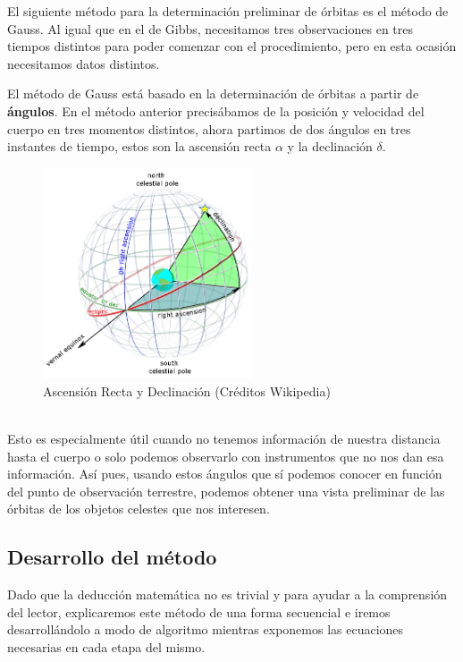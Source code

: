 \documentclass{article}
\numberwithin{equation}{section}
\begin{document}
El siguiente método para la determinación preliminar de órbitas es el método de Gauss. Al igual que en el de Gibbs, necesitamos tres observaciones en tres tiempos distintos para poder comenzar con el procedimiento, pero en esta ocasión necesitamos datos distintos.\par

El método de Gauss está basado en la determinación de órbitas a partir de \textbf{ángulos}. En el método anterior precisábamos de la posición y velocidad del cuerpo en tres momentos distintos, ahora partimos de dos ángulos en tres instantes de tiempo, estos son la ascensión recta $\alpha$ y la declinación $\delta$.\par

\begin{figure}[h]
    \centering
    \includegraphics[width=0.55\textwidth]{ARyD.png}
    \caption{Ascensión Recta y Declinación (Créditos 
    Wikipedia)}
\end{figure} \\

Esto es especialmente útil cuando no tenemos información de nuestra distancia hasta el cuerpo o solo podemos observarlo con instrumentos que no nos dan esa información. Así pues, usando estos ángulos que sí podemos conocer en función del punto de observación terrestre, podemos obtener una vista preliminar de las órbitas de los objetos celestes que nos interesen.\par

\subsection{Desarrollo del método}

Dado que la deducción matemática no es trivial y para ayudar a la comprensión del lector, explicaremos este método de una forma secuencial e iremos desarrollándolo a modo de algoritmo mientras exponemos las ecuaciones necesarias en cada etapa del mismo.\par
\end{document}
